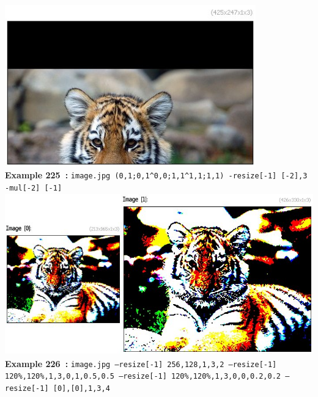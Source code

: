 \documentclass[a4paper,11pt,twoside]{book}
\begin{document}
\begin{center}\includegraphics[keepaspectratio=true,height=7cm,width=\textwidth]{img/gmic_def225.jpg}\\
{\footnotesize \textbf{Example 225~:} \texttt{image.jpg (0,1;0,1\textasciicircum 0,0;1,1\textasciicircum 1,1;1,1) -resize[-1] [-2],3 -mul[-2] [-1]}}
\\\includegraphics[keepaspectratio=true,height=7cm,width=\textwidth]{img/gmic_def226.jpg}\\
{\footnotesize \textbf{Example 226~:} \texttt{image.jpg --resize[-1] 256,128,1,3,2 --resize[-1] 120\%,120\%,1,3,0,1,0.5,0.5 --resize[-1] 120\%,120\%,1,3,0,0,0.2,0.2 --resize[-1] [0],[0],1,3,4}}
\end{center}
\end{document}
